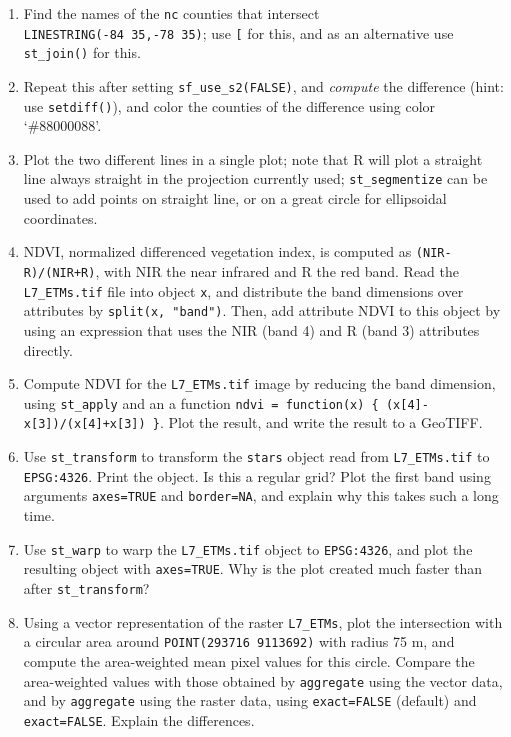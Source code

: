 \documentclass[]{book}
\providecommand{\tightlist}{%
  \setlength{\itemsep}{0pt}\setlength{\parskip}{0pt}}
\begin{document}
\begin{enumerate}
\def\labelenumi{\arabic{enumi}.}
\tightlist
\item
  Find the names of the \texttt{nc} counties that intersect \texttt{LINESTRING(-84\ 35,-78\ 35)}; use \texttt{{[}} for this, and as an alternative use \texttt{st\_join()} for this.
\item
  Repeat this after setting \texttt{sf\_use\_s2(FALSE)}, and \emph{compute} the difference (hint: use \texttt{setdiff()}), and color the counties of the difference using color `\#88000088'.
\item
  Plot the two different lines in a single plot; note that R will plot a straight line always straight in the projection currently used; \texttt{st\_segmentize} can be used to add points on straight line, or on a great circle for ellipsoidal coordinates.
\item
  NDVI, normalized differenced vegetation index, is computed as \texttt{(NIR-R)/(NIR+R)}, with NIR the near infrared and R the red band. Read the \texttt{L7\_ETMs.tif} file into object \texttt{x}, and distribute the band dimensions over attributes by \texttt{split(x,\ "band")}. Then, add attribute NDVI to this object by using an expression that uses the NIR (band 4) and R (band 3) attributes directly.
\item
  Compute NDVI for the \texttt{L7\_ETMs.tif} image by reducing the band dimension, using \texttt{st\_apply} and an a function \texttt{ndvi\ =\ function(x)\ \{\ (x{[}4{]}-x{[}3{]})/(x{[}4{]}+x{[}3{]})\ \}}. Plot the result, and write the result to a GeoTIFF.
\item
  Use \texttt{st\_transform} to transform the \texttt{stars} object read from \texttt{L7\_ETMs.tif} to \texttt{EPSG:4326}. Print the object. Is this a regular grid? Plot the first band using arguments \texttt{axes=TRUE} and \texttt{border=NA}, and explain why this takes such a long time.
\item
  Use \texttt{st\_warp} to warp the \texttt{L7\_ETMs.tif} object to \texttt{EPSG:4326}, and plot the resulting object with \texttt{axes=TRUE}. Why is the plot created much faster than after \texttt{st\_transform}?
\item
  Using a vector representation of the raster \texttt{L7\_ETMs}, plot the
  intersection with a circular area around \texttt{POINT(293716\ 9113692)} with
  radius 75 m, and compute the area-weighted mean pixel values for
  this circle. Compare the area-weighted values with those obtained
  by \texttt{aggregate} using the vector data, and by \texttt{aggregate} using
  the raster data, using \texttt{exact=FALSE} (default) and \texttt{exact=FALSE}.
  Explain the differences.
\end{enumerate}
\end{document}
